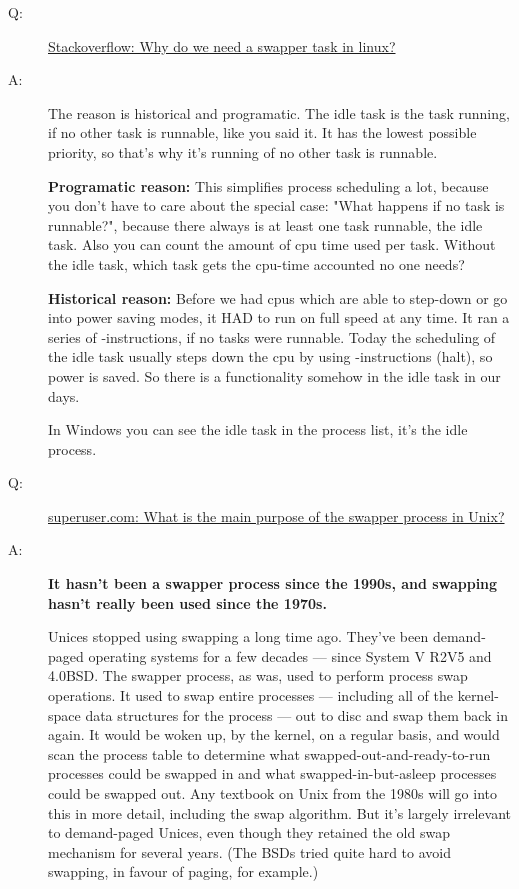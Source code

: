 \begin{description}
\item[Q:]
  \href{http://stackoverflow.com/questions/464483/why-do-we-need-a-swapper-task-in-linux}{%
    Stackoverflow: Why do we need a swapper task in linux?}
\item[A:] The reason is historical and programatic. The idle task is the task running, if
  no other task is runnable, like you said it. It has the lowest possible priority, so
  that's why it's running of no other task is runnable.

  \textbf{Programatic reason:} This simplifies process scheduling a lot, because you don't
  have to care about the special case: "What happens if no task is runnable?", because
  there always is at least one task runnable, the idle task. Also you can count the amount
  of cpu time used per task. Without the idle task, which task gets the cpu-time accounted
  no one needs?

  \textbf{Historical reason:} Before we had cpus which are able to step-down or go into
  power saving modes, it HAD to run on full speed at any time. It ran a series of
  -instructions, if no tasks were runnable. Today the scheduling of the idle
  task usually steps down the cpu by using -instructions (halt), so power is
  saved. So there is a functionality somehow in the idle task in our days.

  In Windows you can see the idle task in the process list, it's the idle process.
  
\item[Q:] \href{http://superuser.com/questions/377572/swapper-process}{%
    superuser.com: What is the main purpose of the swapper process in Unix?}

\item[A:] \textbf{It hasn't been a swapper process since the 1990s, and swapping hasn't really
  been used since the 1970s.}

  Unices stopped using swapping a long time ago. They've been demand-paged operating
  systems for a few decades --- since System V R2V5 and 4.0BSD. The swapper process, as was,
  used to perform process swap operations. It used to swap entire processes --- including
  all of the kernel-space data structures for the process --- out to disc and swap them back
  in again. It would be woken up, by the kernel, on a regular basis, and would scan the
  process table to determine what swapped-out-and-ready-to-run processes could be swapped
  in and what swapped-in-but-asleep processes could be swapped out. Any textbook on Unix
  from the 1980s will go into this in more detail, including the swap algorithm. But it's
  largely irrelevant to demand-paged Unices, even though they retained the old swap
  mechanism for several years. (The BSDs tried quite hard to avoid swapping, in favour of
  paging, for example.)


\end{description}
